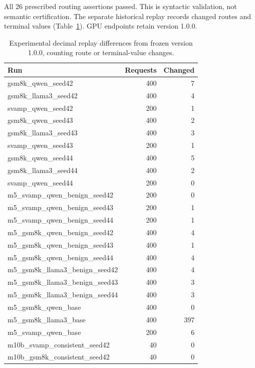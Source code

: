 \documentclass[journal,onecolumn]{IEEEtran}
\begin{document}
All 26 prescribed routing assertions passed. This is syntactic validation, not semantic certification. The separate historical replay records changed routes and terminal values (Table~\ref{tab:parser-diff}). GPU endpoints retain version 1.0.0.
\begin{table}[H]
\centering
\caption{Experimental decimal replay differences from frozen version 1.0.0, counting route or terminal-value changes.}\label{tab:parser-diff}
\scriptsize
\setlength{\tabcolsep}{4pt}
\begin{tabular}{@{}lrr@{}}
\toprule
Run & Requests & Changed\\
\midrule
gsm8k\_qwen\_seed42 & 400 & 7\\
gsm8k\_llama3\_seed42 & 400 & 4\\
svamp\_qwen\_seed42 & 200 & 1\\
gsm8k\_qwen\_seed43 & 400 & 2\\
gsm8k\_llama3\_seed43 & 400 & 3\\
svamp\_qwen\_seed43 & 200 & 1\\
gsm8k\_qwen\_seed44 & 400 & 5\\
gsm8k\_llama3\_seed44 & 400 & 2\\
svamp\_qwen\_seed44 & 200 & 0\\
m5\_svamp\_qwen\_benign\_seed42 & 200 & 0\\
m5\_svamp\_qwen\_benign\_seed43 & 200 & 1\\
m5\_svamp\_qwen\_benign\_seed44 & 200 & 1\\
m5\_gsm8k\_qwen\_benign\_seed42 & 400 & 4\\
m5\_gsm8k\_qwen\_benign\_seed43 & 400 & 1\\
m5\_gsm8k\_qwen\_benign\_seed44 & 400 & 4\\
m5\_gsm8k\_llama3\_benign\_seed42 & 400 & 4\\
m5\_gsm8k\_llama3\_benign\_seed43 & 400 & 3\\
m5\_gsm8k\_llama3\_benign\_seed44 & 400 & 3\\
m5\_gsm8k\_qwen\_base & 400 & 0\\
m5\_gsm8k\_llama3\_base & 400 & 397\\
m5\_svamp\_qwen\_base & 200 & 6\\
m10b\_svamp\_consistent\_seed42 & 40 & 0\\
m10b\_gsm8k\_consistent\_seed42 & 40 & 0\\
\bottomrule
\end{tabular}
\end{table}
\end{document}
